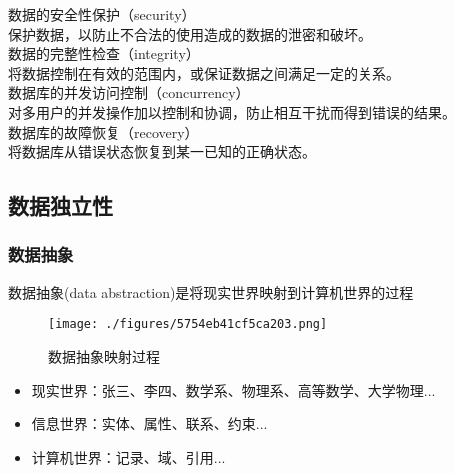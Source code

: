 \begin{enumerate}
\begin{itemize}
数据的安全性保护（security）\\
保护数据，以防止不合法的使用造成的数据的泄密和破坏。\\

数据的完整性检查（integrity）\\
将数据控制在有效的范围内，或保证数据之间满足一定的关系。\\

数据库的并发访问控制（concurrency）\\
对多用户的并发操作加以控制和协调，防止相互干扰而得到错误的结果。\\

数据库的故障恢复（recovery）\\
将数据库从错误状态恢复到某一已知的正确状态。\\

\end{itemize}
\end{enumerate}

\subsection{数据独立性}
\subsubsection{数据抽象} 
数据抽象(data abstraction)是将现实世界映射到计算机世界的过程
\begin{figure}[ht]
\centering
\texttt{[image: ./figures/5754eb41cf5ca203.png]}
\caption{数据抽象映射过程} \label{fig_DBS001_1}
\end{figure}
\begin{itemize}
\item 现实世界：张三、李四、数学系、物理系、高等数学、大学物理...\\
\item 信息世界：实体、属性、联系、约束...\\
\item 计算机世界：记录、域、引用...\\
\end{itemize}
